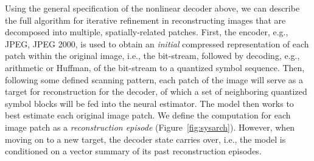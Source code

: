 \documentclass[smallabstract,smallcaptions]{dccpaper}
\begin{document}
Using the general specification of the nonlinear decoder above, we can describe the full algorithm for iterative refinement in reconstructing images that are decomposed into multiple, spatially-related patches. First, the encoder, e.g., JPEG, JPEG 2000, is used to obtain an \emph{initial} compressed representation of each patch within the original image, i.e., the bit-stream, followed by decoding, e.g., arithmetic or Huffman, of the bit-stream to a quantized symbol sequence. Then, following some defined scanning pattern, each patch of the image will serve as a target for reconstruction for the decoder, of which a set of neighboring quantized symbol blocks will be fed into the neural estimator. The model then works to best estimate each original image patch. We define the computation for each image patch as a \emph{reconstruction episode} (Figure~\ref{fig:sysarch}). However, when moving on to a new target, the decoder state carries over, i.e., the model is conditioned on a vector summary of its past reconstruction episodes. %
\end{document}
